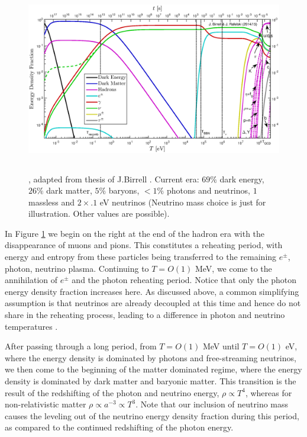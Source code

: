 \begin{figure}
\centerline{\includegraphics[height=8.2cm]{01-introduction/Figures/energy_densities_total.eps}}\label{fig:energy_frac}
\caption{, adapted from thesis of J.Birrell \cite{Birrell:2014ona}. Current era: $69\%$ dark energy, $26\%$ dark matter, $5\%$ baryons, $<1\%$ photons and neutrinos, $1$ massless and $2\times .1$ eV neutrinos (Neutrino mass choice is just for illustration. Other values are possible). }
 \end{figure}
In Figure \ref{fig:energy_frac} we begin on the right at the end of the hadron era with the disappearance of muons and pions. This constitutes a reheating period, with energy and entropy from these particles being transferred to the remaining $e^\pm$, photon, neutrino plasma. Continuing to $T=O(1)$ MeV, we come to the annihilation of $e^\pm$ and the photon reheating period. Notice that only the photon energy density fraction increases here. As discussed above, a common simplifying assumption is that neutrinos are already decoupled at this time and hence do not share in the reheating process, leading to a difference in photon and neutrino temperatures .

After passing through a long period, from $T=O(1)$ MeV until $T=O(1)$ eV, where the energy density is dominated by photons and free-streaming neutrinos, we then come to the beginning of the matter dominated regime, where the energy density is dominated by dark matter and baryonic matter. This transition is the result of the redshifting of the photon and neutrino energy, $\rho\propto T^4$, whereas for non-relativistic matter $\rho\propto a^{-3}\propto T^3$. Note that our inclusion of neutrino mass causes the leveling out of the neutrino energy density fraction during this period, as compared to the continued redshifting of the photon energy.

